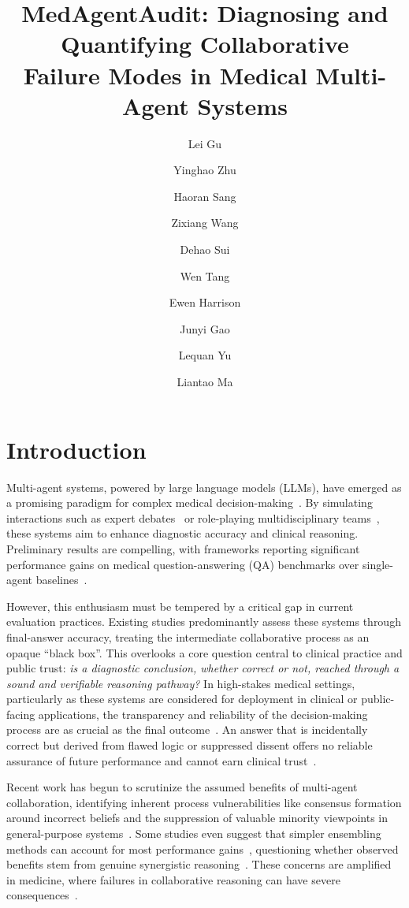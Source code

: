 \documentclass{article}
\title{MedAgentAudit: Diagnosing and Quantifying Collaborative\\ Failure Modes in Medical Multi-Agent Systems}
\author[1,$\ast$]{Lei Gu}
\author[1,2,$\ast$]{Yinghao Zhu}
\author[1,$\ast$]{Haoran Sang}
\author[1,$\ast$]{Zixiang Wang}
\author[1]{Dehao Sui}
\author[3]{Wen Tang}
\author[4]{Ewen Harrison}
\author[4,5]{Junyi Gao}
\author[2,$\dagger$]{Lequan Yu}
\author[1,$\dagger$]{Liantao Ma}
\affil[1]{Peking University}
\affil[2]{The University of Hong Kong}
\affil[3]{Peking University Third Hospital}
\affil[4]{The University of Edinburgh}
\affil[5]{Health Data Research UK}
\begin{document}
\maketitle

\section{Introduction}
Multi-agent systems, powered by large language models (LLMs), have emerged as a promising paradigm for complex medical decision-making~\cite{li2023camel, arora2023promise,zhu2025healthflow}. By simulating interactions such as expert debates~\cite{du2023improving} or role-playing multidisciplinary teams~\cite{tang2024medagents,kim2024mdagents}, these systems aim to enhance diagnostic accuracy and clinical reasoning. Preliminary results are compelling, with frameworks reporting significant performance gains on medical question-answering (QA) benchmarks over single-agent baselines~\cite{chen2024reconcile,wu2024autogen,moor2023foundation}.

However, this enthusiasm must be tempered by a critical gap in current evaluation practices. Existing studies predominantly assess these systems through final-answer accuracy, treating the intermediate collaborative process as an opaque ``black box''. This overlooks a core question central to clinical practice and public trust: \emph{is a diagnostic conclusion, whether correct or not, reached through a sound and verifiable reasoning pathway?} In high-stakes medical settings, particularly as these systems are considered for deployment in clinical or public-facing applications, the transparency and reliability of the decision-making process are as crucial as the final outcome~\cite{ribeiro2016should}. An answer that is incidentally correct but derived from flawed logic or suppressed dissent offers no reliable assurance of future performance and cannot earn clinical trust~\cite{sbaffi2017trust}.

Recent work has begun to scrutinize the assumed benefits of multi-agent collaboration, identifying inherent process vulnerabilities like consensus formation around incorrect beliefs and the suppression of valuable minority viewpoints in general-purpose systems~\cite{pan2025multiagent,choi2025debate,zhu2025medagentboard}. Some studies even suggest that simpler ensembling methods can account for most performance gains~\cite{choi2025debate,kaesberg2025voting}, questioning whether observed benefits stem from genuine synergistic reasoning~\cite{madaan2023selfrefine}. These concerns are amplified in medicine, where failures in collaborative reasoning can have severe consequences~\cite{huang2023large}.
\end{document}
